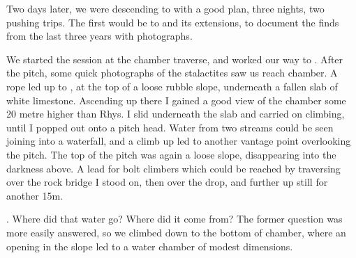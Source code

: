     Two days later, we were descending to  with a good plan, three nights, two pushing trips. The first would be to  and its extensions, to document the finds from the last three years with photographs.

    We started the session at the  chamber traverse, and worked our way to . After the pitch, some quick photographs of the  stalactites saw us reach  chamber. A rope led up to , at the top of a loose rubble slope, underneath a fallen slab of white limestone. Ascending up there I gained a good view of the chamber some 20 metre higher than Rhys. I slid underneath the slab and carried on climbing, until I popped out onto a pitch head. Water from two streams could be seen joining into a waterfall, and a climb up led to another vantage point overlooking the pitch. The top of the pitch was again a loose slope, disappearing into the darkness above. A lead for bolt climbers which could be reached by traversing over the rock bridge I stood on, then over the drop, and further up still for another 15m.

	. Where did that water go? Where did it come from? The former question was more easily answered, so we climbed down to the bottom of  chamber, where an opening in the slope led to a water chamber of modest dimensions.

